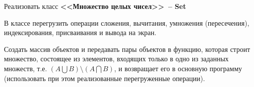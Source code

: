 Реализовать класс \textbf{<<Множество целых чисел>>~-- Set}

В классе перегрузить операции сложения, вычитания,
умножения (пересечения), индексирования, присваивания и вывода на экран.

Создать
массив объектов и передавать пары объектов в функцию, которая строит множество,
состоящее из элементов, входящих только в одно из заданных множеств, 
т.е. $(A\bigcup B) \setminus (A\bigcap B)$, и возвращает его в основную программу (использовать при этом
реализованные перегруженные операции).

